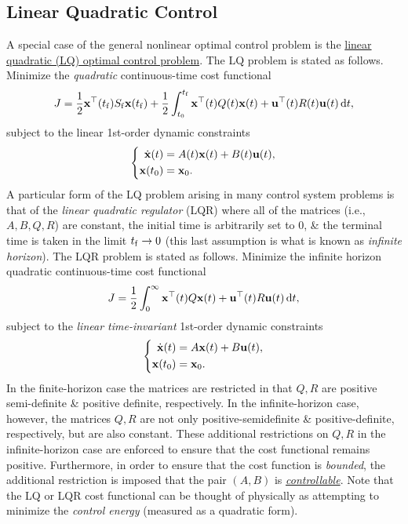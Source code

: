 \documentclass{article}
\begin{document}
\subsection{Linear Quadratic Control}
A special case of the general nonlinear optimal control problem is the \href{https://en.wikipedia.org/wiki/Linear-quadratic_regulator}{linear quadratic (LQ) optimal control problem}. The LQ problem is stated as follows. Minimize the {\it quadratic} continuous-time cost functional
\begin{equation}
	J = \frac{1}{2}{\bf x}^\top(t_{\rm f})S_{\rm f}{\bf x}(t_{\rm f}) + \frac{1}{2}\int_{t_0}^{t_{\rm f}} {\bf x}^\top(t)Q(t){\bf x}(t) + {\bf u}^\top(t)R(t){\bf u}(t)\,{\rm d}t,
\end{equation}
subject to the linear 1st-order dynamic constraints
\begin{equation}
	\left\{\begin{split}
		\dot{\bf x}(t) &= A(t){\bf x}(t) + B(t){\bf u}(t),\\
		{\bf x}(t_0) &= {\bf x}_0.
	\end{split}\right.
\end{equation}
A particular form of the LQ problem arising in many control system problems is that of the {\it linear quadratic regulator} (LQR) where all of the matrices (i.e., $A,B,Q,R$) are constant, the initial time is arbitrarily set to 0, \& the terminal time is taken in the limit $t_{\rm f}\to0$ (this last assumption is what is known as {\it infinite horizon}). The LQR problem is stated as follows. Minimize the infinite horizon quadratic continuous-time cost functional
\begin{equation}
	J = \frac{1}{2}\int_0^\infty {\bf x}^\top(t)Q{\bf x}(t) + {\bf u}^\top(t)R{\bf u}(t)\,{\rm d}t,
\end{equation}
subject to the {\it linear time-invariant} 1st-order dynamic constraints
\begin{equation}
	\left\{\begin{split}
		\dot{\bf x}(t) &= A{\bf x}(t) + B{\bf u}(t),\\
		{\bf x}(t_0) &= {\bf x}_0.
	\end{split}\right.
\end{equation}
In the finite-horizon case the matrices are restricted in that $Q,R$ are positive semi-definite \& positive definite, respectively. In the infinite-horizon case, however, the matrices $Q,R$ are not only positive-semidefinite \& positive-definite, respectively, but are also constant. These additional restrictions on $Q,R$ in the infinite-horizon case are enforced to ensure that the cost functional remains positive. Furthermore, in order to ensure that the cost function is {\it bounded}, the additional restriction is imposed that the pair $(A,B)$ is \href{https://en.wikipedia.org/wiki/Controllability}{\it controllable}. Note that the LQ or LQR cost functional can be thought of physically as attempting to minimize the {\it control energy} (measured as a quadratic form).
\end{document}
